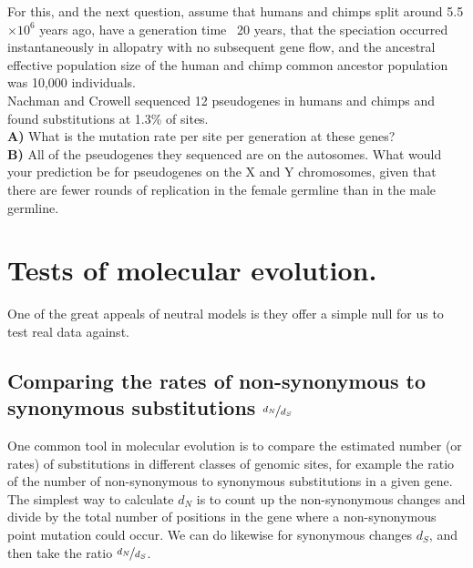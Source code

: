 



\begin{question}{}
For this, and the next question, assume that humans and chimps split
around 5.5$\times 10^6$ years ago, have a generation time ~20 years, that the speciation occurred instantaneously in allopatry with no subsequent gene flow, and the ancestral effective population size of the human and chimp common ancestor population was 10,000 individuals.\\
Nachman and Crowell sequenced 12 pseudogenes in humans and chimps and found substitutions at 1.3\% of sites. \\
{\bf A) } What is the mutation rate per site per generation at these genes?\\
{\bf B)} All of the pseudogenes they sequenced are on the autosomes. What
would your prediction be for pseudogenes on the X and Y chromosomes,
given that there are fewer rounds of replication in the female
germline than in the male germline.
\end{question}

\section{Tests of molecular evolution.}
One of the great appeals of neutral models is they offer a simple null
for us to test real data against. 
\subsection{Comparing the rates of non-synonymous to synonymous
substitutions $\nicefrac{d_N}{d_S}$}
One common tool in molecular evolution is to compare the estimated number (or rates) of substitutions in different classes of genomic sites, for example the ratio of the number of non-synonymous to synonymous substitutions in a given gene. The simplest way to calculate $d_N$ is to
count up the non-synonymous changes and divide by the total number of
positions in the gene where a non-synonymous point mutation could occur. We
can do likewise for synonymous changes $d_S$, and then take the ratio $\nicefrac{d_N}{d_S}$.

